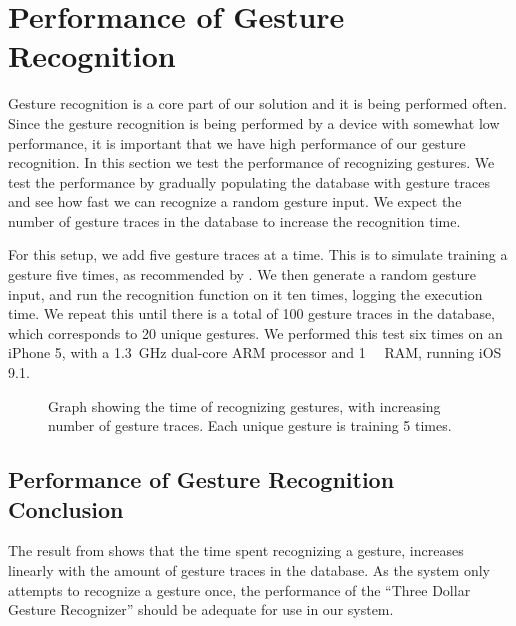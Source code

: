 \section{Performance of Gesture Recognition}\label{sec:gestureperformance}
Gesture recognition is a core part of our solution and it is being performed often. 
Since the gesture recognition is being performed by a device with somewhat low performance,
it is important that we have high performance of our gesture recognition. 
In this section we test the performance of recognizing gestures. 
We test the performance by gradually populating the database with gesture traces and see how fast we can recognize a random gesture input.
We expect the number of gesture traces in the database to increase the recognition time.

For this setup, we add five gesture traces at a time. 
This is to simulate training a gesture five times, 
as recommended by \cite{threedollar}. 
We then generate a random gesture input, 
and run the recognition function on it ten times, 
logging the execution time.
We repeat this until there is a total of \num{100} gesture traces in the database, 
which corresponds to \num{20} unique gestures.
We performed this test six times on an iPhone 5, 
with a \SI{1.3}{\giga\hertz} dual-core ARM processor and \SI{1}{\giga\byte} RAM, running iOS \num{9.1}.

\begin{figure}[!htb]
    \centering
    
    \caption{Graph showing the time of recognizing gestures, with increasing number of gesture traces. Each unique gesture is training \num{5} times.}
    \label{fig:performancegraph}
\end{figure}

\subsection{Performance of Gesture Recognition Conclusion}
The result from  shows that the time spent recognizing a gesture, 
increases linearly with the amount of gesture traces in the database.
As the system only attempts to recognize a gesture once, 
the performance of the ``Three Dollar Gesture Recognizer'' should be adequate for use in our system. 
